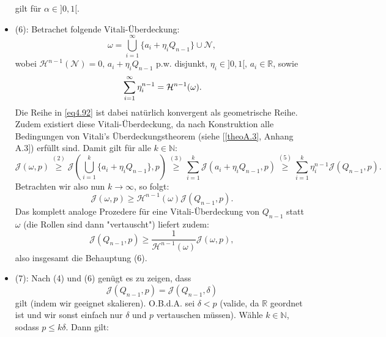 \begin{itemize}
\begin{equation}
    \end{equation}
    gilt für \(\alpha \in ]0,1[\).
    \item (6): Betrachet folgende Vitali-Überdeckung:
    \begin{equation}
        \omega = \bigcup_{i=1}^{\infty} \{a_i + \eta_i Q_{n-1}\} \cup \mathcal{N},
    \end{equation}
    wobei \(\mathcal{H}^{n-1}(\mathcal{N}) = 0, \, a_i + \eta_i Q_{n-1}\) p.w. disjunkt, \(\eta_i \in ]0,1[, \, a_i \in \mathbb{R}\), sowie
    \begin{equation}{\label{eq4.92}}
        \sum_{i=1}^{\infty} \eta_i^{n-1} = \mathcal{H}^{n-1}(\omega).
    \end{equation}
    Die Reihe in \eqref{eq4.92} ist dabei natürlich konvergent als geometrische Reihe. Zudem existiert diese Vitali-Überdeckung, da nach Konstruktion alle Bedingungen von Vitali's Überdeckungstheorem (siehe [\ref{theoA.3}, Anhang A.3]) erfüllt sind. Damit gilt für alle \(k \in \mathbb{N}\):
    \begin{equation}
        \mathcal{J}(\omega,p) \stackrel{(2)}{\geq} \mathcal{J}(\bigcup_{i=1}^{k} \{a_i + \eta_i Q_{n-1}\},p) \stackrel{(3)}{\geq} \sum_{i=1}^k \mathcal{J}(a_i + \eta_i Q_{n-1},p) \stackrel{(5)}{\geq} \sum_{i=1}^k \eta_i^{n-1} \mathcal{J}(Q_{n-1},p).
    \end{equation}
    Betrachten wir also nun \(k \to \infty\), so folgt:
    \begin{equation}
        \mathcal{J}(\omega,p) \geq \mathcal{H}^{n-1}(\omega) \mathcal{J}(Q_{n-1},p).
    \end{equation}
    Das komplett analoge Prozedere für eine Vitali-Überdeckung von \(Q_{n-1}\) statt \(\omega\) (die Rollen sind dann "vertauscht") liefert zudem:
    \begin{equation}
        \mathcal{J}(Q_{n-1},p) \geq \frac{1}{\mathcal{H}^{n-1}(\omega)}\mathcal{J}(\omega,p),
    \end{equation}
    also insgesamt die Behauptung (6).
    \item (7): Nach (4) und (6) genügt es zu zeigen, dass
    \begin{equation}
        \mathcal{J}(Q_{n-1},p) = \mathcal{J}(Q_{n-1},\delta)
    \end{equation}
    gilt (indem wir geeignet skalieren). O.B.d.A. sei \(\delta < p\) (valide, da \(\mathbb{R}\) geordnet ist und wir sonst einfach nur \(\delta\) und \(p\) vertauschen müssen). Wähle \(k \in \mathbb{N}\), sodass \(p \leq k \delta\). Dann gilt:
    \begin{equation}

\end{equation}
\end{itemize}
